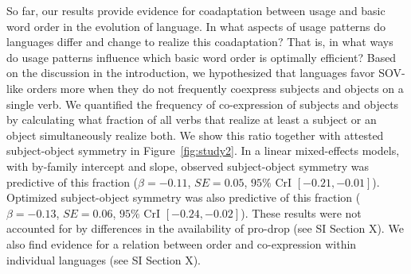 \documentclass[11pt,a4paper]{article}
\begin{document}
So far, our results provide evidence for coadaptation between usage and basic word order in the evolution of language.
In what aspects of usage patterns do languages differ and change to realize this coadaptation?
That is, in what ways do usage patterns influence which basic word order is optimally efficient?
Based on the discussion in the introduction, we hypothesized that languages favor SOV-like orders more when they do not frequently coexpress subjects and objects on a single verb.
We quantified the frequency of co-expression of subjects and objects by calculating what fraction of all verbs that realize at least a subject or an object simultaneously realize both.
We show this ratio together with attested subject-object symmetry in Figure~\ref{fig:study2}.
In a linear mixed-effects models, with by-family intercept and slope, observed subject-object symmetry was predictive of this fraction ($\beta=-0.11$, $SE=0.05$, $95\%$ CrI $[-0.21, -0.01]$).
Optimized subject-object symmetry was also predictive of this fraction ($\beta=-0.13$, $SE=0.06$, $95\%$ CrI $[-0.24,  -0.02]$).
These results were not accounted for by differences in the availability of pro-drop (see SI Section X).
We also find evidence for a relation between order and co-expression within individual languages (see SI Section X). %








\end{document}
